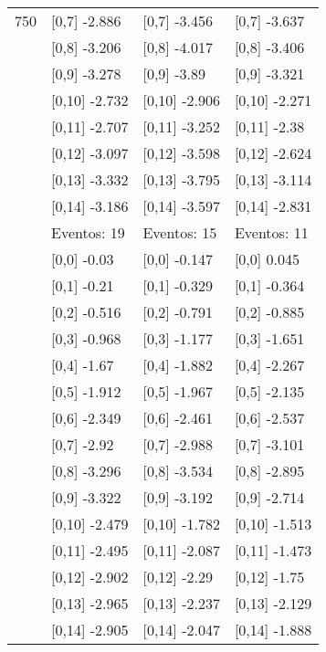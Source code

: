 \begin{table}
\begin{tabular}[t]{llll}
750 & {}[0,7] -2.886 & {}[0,7] -3.456 & {}[0,7] -3.637\\
\addlinespace
 & {}[0,8] -3.206 & {}[0,8] -4.017 & {}[0,8] -3.406\\
 & {}[0,9] -3.278 & {}[0,9] -3.89 & {}[0,9] -3.321\\
 & {}[0,10] -2.732 & {}[0,10] -2.906 & {}[0,10] -2.271\\
 & {}[0,11] -2.707 & {}[0,11] -3.252 & {}[0,11] -2.38\\
 & {}[0,12] -3.097 & {}[0,12] -3.598 & {}[0,12] -2.624\\
\addlinespace
 & {}[0,13] -3.332 & {}[0,13] -3.795 & {}[0,13] -3.114\\
 & {}[0,14] -3.186 & {}[0,14] -3.597 & {}[0,14] -2.831\\
 & Eventos:  19 & Eventos:  15 & Eventos:  11\\
 & {}[0,0] -0.03 & {}[0,0] -0.147 & {}[0,0] 0.045\\
 & {}[0,1] -0.21 & {}[0,1] -0.329 & {}[0,1] -0.364\\
\addlinespace
 & {}[0,2] -0.516 & {}[0,2] -0.791 & {}[0,2] -0.885\\
 & {}[0,3] -0.968 & {}[0,3] -1.177 & {}[0,3] -1.651\\
 & {}[0,4] -1.67 & {}[0,4] -1.882 & {}[0,4] -2.267\\
 & {}[0,5] -1.912 & {}[0,5] -1.967 & {}[0,5] -2.135\\
 & {}[0,6] -2.349 & {}[0,6] -2.461 & {}[0,6] -2.537\\
\addlinespace
1000 & {}[0,7] -2.92 & {}[0,7] -2.988 & {}[0,7] -3.101\\
 & {}[0,8] -3.296 & {}[0,8] -3.534 & {}[0,8] -2.895\\
 & {}[0,9] -3.322 & {}[0,9] -3.192 & {}[0,9] -2.714\\
 & {}[0,10] -2.479 & {}[0,10] -1.782 & {}[0,10] -1.513\\
 & {}[0,11] -2.495 & {}[0,11] -2.087 & {}[0,11] -1.473\\
\addlinespace
 & {}[0,12] -2.902 & {}[0,12] -2.29 & {}[0,12] -1.75\\
 & {}[0,13] -2.965 & {}[0,13] -2.237 & {}[0,13] -2.129\\
 & {}[0,14] -2.905 & {}[0,14] -2.047 & {}[0,14] -1.888\\
\bottomrule
\end{tabular}
\end{table}
